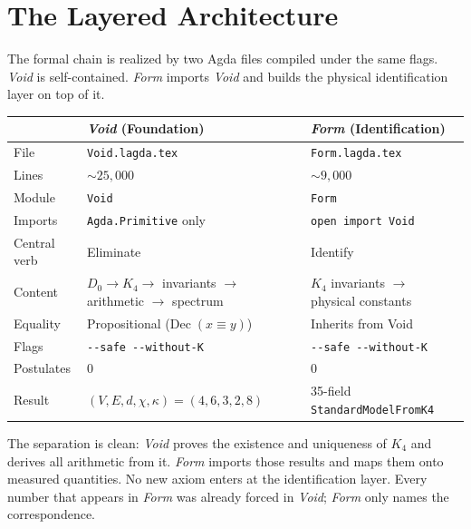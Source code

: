 \documentclass[11pt,a4paper]{article}
\theoremstyle{definition}
\begin{document}
\section{The Layered Architecture}
\label{sec:architecture}

The formal chain is realized by two Agda files compiled under the same flags.
\textit{Void} is self-contained.  \textit{Form} imports \textit{Void}
and builds the physical identification layer on top of it.

\begin{center}
\small
\renewcommand{\arraystretch}{1.3}
\begin{tabular}{@{}lll@{}}
\toprule
& \textbf{\textit{Void} (Foundation)} & \textbf{\textit{Form} (Identification)} \\
\midrule
File         & \texttt{Void.lagda.tex} & \texttt{Form.lagda.tex} \\
Lines        & ${\sim}25{,}000$ & ${\sim}9{,}000$ \\
Module       & \texttt{Void} & \texttt{Form} \\
Imports      & \texttt{Agda.Primitive} only & \texttt{open import Void} \\
Central verb & Eliminate & Identify \\
Content      & $D_0 \to K_4 \to$ invariants $\to$ arithmetic $\to$ spectrum & $K_4$ invariants $\to$ physical constants \\
Equality     & Propositional ($\text{Dec}\;(x \equiv y)$) & Inherits from Void \\
Flags        & \texttt{-{}-safe -{}-without-K} & \texttt{-{}-safe -{}-without-K} \\
Postulates   & 0 & 0 \\
Result       & $(V,E,d,\chi,\kappa) = (4,6,3,2,8)$ & 35-field \texttt{StandardModelFromK4} \\
\bottomrule
\end{tabular}
\end{center}

The separation is clean: \textit{Void} proves the existence and uniqueness
of $K_4$ and derives all arithmetic from it.  \textit{Form} imports those
results and maps them onto measured quantities.  No new axiom enters at the
identification layer.  Every number that appears in \textit{Form} was
already forced in \textit{Void}; \textit{Form} only names the correspondence.

\end{document}
